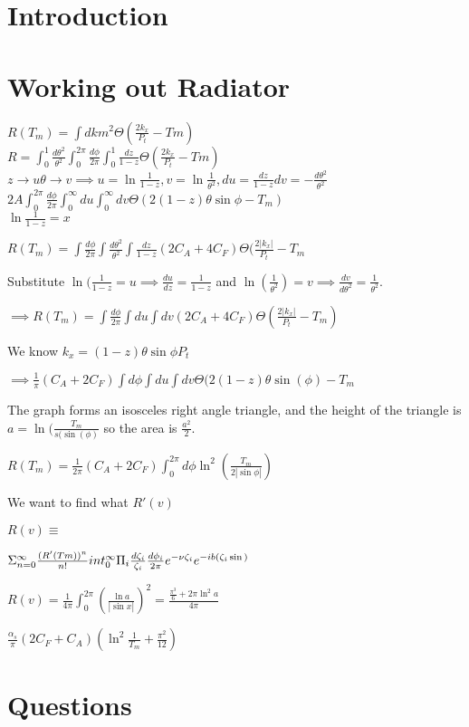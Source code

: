 \documentclass[12pt,twoside]{article}
\begin{document}



\section{Introduction}

\section{Working out Radiator}
$R(T_m) = \int dk m^2 \Theta \left(\frac{2k_x}{P_t} - Tm\right)$\\
$R = \int_{0}^{1} \frac{d \theta ^2}{\theta ^2} \int_{0}^{2\pi} \frac{d\phi}{2\pi} \int_{0}^{1} \frac{dz}{1-z} \Theta \left(\frac{2k_x}{P_t} - Tm\right)$\\
$z \to u\theta \to v \implies u = \ln{\frac{1}{1-z}}, v = \ln{\frac{1}{\theta ^2}}, du = \frac{dz}{1-z} dv = -\frac{d\theta^2}{\theta^2}$ \\
$2A \int_{0}^{2\pi} \frac{d\phi}{2\pi} \int_{0}^{\infty} du \int_{0}^{\infty} dv \Theta (2(1-z)\theta \sin{\phi} - T_m) $ \\
$\ln{\frac{1}{1-z}} =x$

$R(T_m) = \int \frac{d\phi}{2\pi} \int \frac{d\theta^2}{\theta^2} \int \frac{dz}{1-z} (2C_A +4C_F) \Theta(\frac{2|k_x|}{P_t} - T_m$

Substitute $\ln(\frac{1}{1-z} = u \implies \frac{du}{dz} = \frac{1}{1-z}$ and $\ln (\frac{1}{\theta^2}) = v \implies \frac{dv}{d\theta^2} = \frac{1}{\theta^2}$.

$\implies R(T_m) = \int \frac{d\phi}{2\pi} \int du \int dv (2C_A + 4C_F)\Theta \left( \frac{2|k_x|}{P_t} - T_m \right)$

We know $k_x = (1-z)\theta\sin{\phi} P_t$

$\implies \frac{1}{\pi}(C_A + 2C_F) \int d\phi \int du \int dv \Theta (2(1-z)\theta \sin (\phi) - T_m$

The graph forms an isosceles right angle triangle, and the height of the triangle is $a = \ln (\frac{T_m}{s(\sin(\phi)}$ so the area is $\frac{a^2}{2}$.

$R(T_m) = \frac{1}{2π}(C_A + 2C_F) \int_{0}^{2\pi} d\phi \ln^2(\frac{T_m}{2|\sin \phi|})$

We want to find what $R'(v)$ 

$R(v) \equiv $

$\Sigma_{n=0}^\infty \frac{(R'(Tm))^n}{n!} \\int_{0}^{\infty} \Pi_i \frac{d\zeta_i}{\zeta_i} \frac{d\phi_i}{2\pi} e^{-\nu \zeta_i} e^{-ib (\zeta_i \sin{})}$

$R(v) = \frac{1}{4\pi} \int_0^{2\pi} (\frac{\ln a}{| \sin{x} |})^2 = \frac{\frac{\pi^3}{6}+2\pi\ln ^2 a}{4\pi}$

$\frac{\alpha_s}{\pi}(2C_F + C_A)(\ln^2 \frac{1}{T_m} +\frac{\pi^2}{12})$

\section{Questions}
\end{document}
